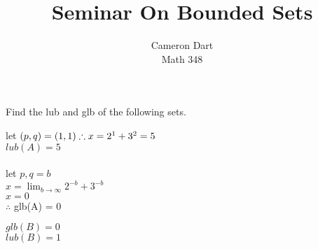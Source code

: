 \documentclass[12pt]{article}
\newenvironment{exercise}[2][Exercise]{\begin{trivlist}
\item[\hskip \labelsep {\bfseries #1}\hskip \labelsep {\bfseries #2.}]}{\end{trivlist}}
\newenvironment{question}[2][Question]{\begin{trivlist}
\item[\hskip \labelsep {\bfseries #1}\hskip \labelsep {\bfseries #2.}]}{\end{trivlist}}
\begin{document}
  
\title{Seminar On Bounded Sets}
\author{Cameron Dart\\ 
Math 348} 

\maketitle 

\begin{question}{4}
Find the lub and glb of the following sets.
\end{question}
\begin{exercise}{$A = \{x \vert x = 2^{-p} + 3^{-q}, \, \forall p,q \in \mathbb{N} \}$}
let $(p,q) = (1,1)\\ \therefore x = 2^1 + 3^2 = 5 $\\
$lub(A) = 5$\\ \\
let $p,q = b$\\
$x = \lim_{b \rightarrow \infty} 2^{-b}+3^{-b}$\\
$x = 0$\\
$\therefore$ glb(A) = 0
\end{exercise}
\begin{exercise}{$B=\{ x \vert (\, x \in (0,1)\,) \wedge (x \in \mathbb{R}) \}\\$}
$glb(B) = 0$\\
$lub(B) = 1$
\end{exercise}
\end{document}
